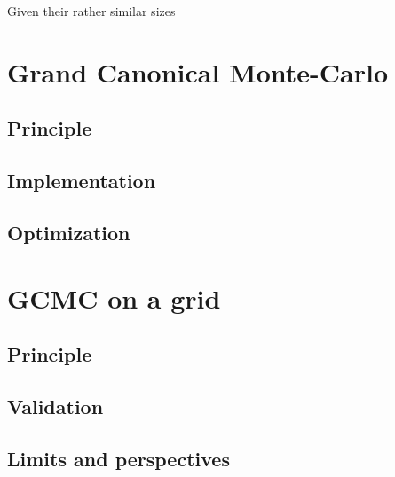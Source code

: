 \documentclass[main.tex]{subfiles}
\begin{document}
Given their rather similar sizes


\section{Grand Canonical Monte-Carlo}
\label{GCMC}

\subsection{Principle}

\subsection{Implementation}

\subsection{Optimization}


\section{GCMC on a grid}

\subsection{Principle}

\subsection{Validation}

\subsection{Limits and perspectives}
\end{document}
